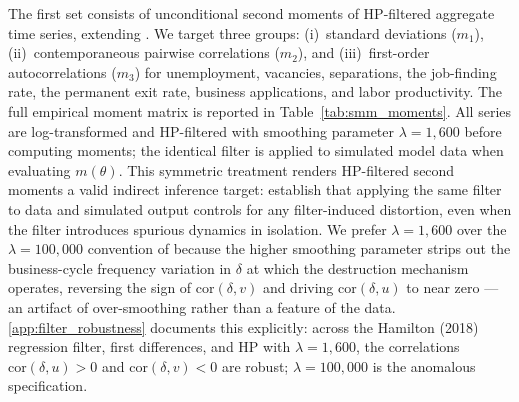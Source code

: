\documentclass[authoryear, review, 12pt]{elsarticle}
\begin{document}
	The first set consists of unconditional second moments of HP-filtered aggregate
	time series, extending \citet{coles_2018}. We target three groups: (i)~standard
	deviations ($m_1$), (ii)~contemporaneous pairwise correlations ($m_2$), and
	(iii)~first-order autocorrelations ($m_3$) for unemployment, vacancies,
	separations, the job-finding rate, the permanent exit rate, business
	applications, and labor productivity. The full empirical moment matrix is
	reported in Table~\ref{tab:smm_moments}. All series are log-transformed and
	HP-filtered with smoothing parameter $\lambda = 1{,}600$ before computing
	moments; the identical filter is applied to simulated model data when evaluating
	$m(\theta)$. This symmetric treatment renders HP-filtered second moments a valid
	indirect inference target: \citet{canova_2011} establish that applying
	the same filter to data and simulated output controls for any filter-induced
	distortion, even when the filter introduces spurious dynamics in isolation.
	We prefer $\lambda=1{,}600$ over the $\lambda=100{,}000$ convention of
	\citet{coles_2018} because the higher smoothing parameter strips out the
	business-cycle frequency variation in $\delta$ at which the destruction
	mechanism operates, reversing the sign of $\text{cor}(\delta,v)$ and driving
	$\text{cor}(\delta,u)$ to near zero --- an artifact of over-smoothing rather
	than a feature of the data.  \ref{app:filter_robustness} documents
	this explicitly: across the Hamilton (2018) regression filter, first differences,
	and HP with $\lambda=1{,}600$, the correlations $\text{cor}(\delta,u)>0$ and
	$\text{cor}(\delta,v)<0$ are robust; $\lambda=100{,}000$ is the anomalous
	specification.
\end{document}
